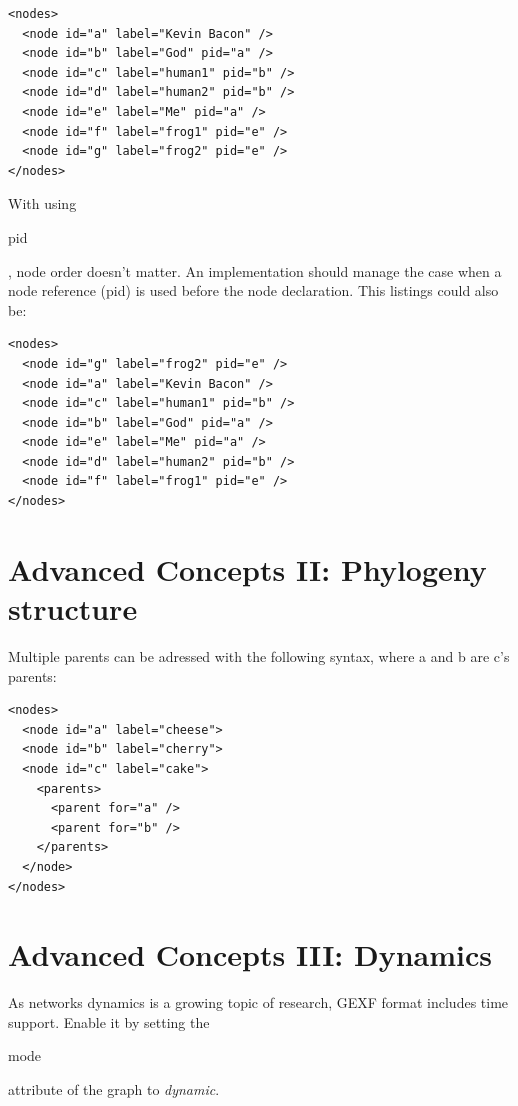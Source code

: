 \documentclass[a4paper,10pt]{article}
\begin{document}
\lstset{ style=gexf }
\begin{lstlisting}[caption={Second way},label=hierarchy2]
<nodes>
  <node id="a" label="Kevin Bacon" />
  <node id="b" label="God" pid="a" />
  <node id="c" label="human1" pid="b" />
  <node id="d" label="human2" pid="b" />
  <node id="e" label="Me" pid="a" />
  <node id="f" label="frog1" pid="e" />
  <node id="g" label="frog2" pid="e" />
</nodes>
\end{lstlisting}

With using \begin{footnotesize}pid\end{footnotesize}, node order doesn't matter. An implementation should manage the case when a node reference (pid) is used before the node declaration. This listings could also be:

\lstset{ style=gexf }
\begin{lstlisting}[caption={Second way randomized},label=hierarchy22]
<nodes>
  <node id="g" label="frog2" pid="e" />
  <node id="a" label="Kevin Bacon" />
  <node id="c" label="human1" pid="b" />
  <node id="b" label="God" pid="a" />
  <node id="e" label="Me" pid="a" />
  <node id="d" label="human2" pid="b" />
  <node id="f" label="frog1" pid="e" />
</nodes>
\end{lstlisting}


\section{Advanced Concepts II: Phylogeny structure} \label{hierarchy}

Multiple parents can be adressed with the following syntax, where a and b are c's parents:
\lstset{ style=gexf }
\begin{lstlisting}[caption={Multiple parents},label=phylogeny1]
<nodes>
  <node id="a" label="cheese">
  <node id="b" label="cherry">
  <node id="c" label="cake">
    <parents>
      <parent for="a" />
      <parent for="b" />
    </parents>
  </node>
</nodes>
\end{lstlisting}

\section{Advanced Concepts III: Dynamics} \label{dynamics}

As networks dynamics is a growing topic of research, GEXF format includes time support. Enable it by setting the \begin{footnotesize}mode\end{footnotesize} attribute of the graph to \textit{dynamic}.
\end{document}
